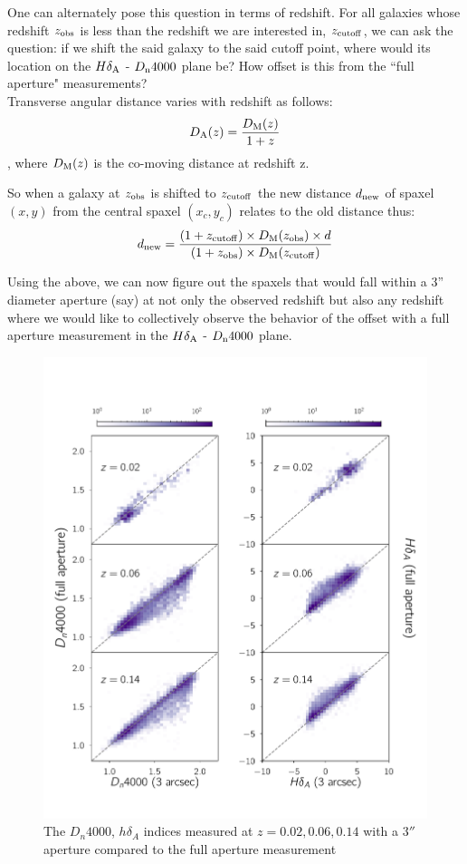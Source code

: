 One can alternately pose this question in terms of redshift. For all galaxies whose redshift $z_{\rm obs}$ is less than the redshift we are interested in, $z_{\rm cutoff}$, we can ask the question: if we shift the said galaxy to the said cutoff point, where would its location on the $H\delta_{\rm A}$ - $D_{\rm n}4000$ plane be? How offset is this from the ``full aperture" measurements?\\

Transverse angular distance varies with redshift as follows:
$$D_{\rm A}(z) = \frac{D_{\rm M}(z)}{1+z} $$,
where $D_{\rm M}(z)$ is the co-moving distance at redshift z.

So when a galaxy at $z_{\rm obs}$ is shifted to $z_{\rm cutoff}$ the new distance $d_{\rm new}$ of spaxel $(x,y)$ from the central spaxel $(x_{c},y_{c})$ relates to the old distance thus:
$$ d_{\rm new} = \frac{(1+z_{\rm cutoff})\times D_{\rm M}(z_{\rm obs}) \times d}{(1+z_{\rm obs}) \times  D_{\rm M}(z_{\rm cutoff})} $$

Using the above, we can now figure out the spaxels that would fall within a 3'' diameter aperture (say) at not only the observed redshift but also any redshift where we would like to collectively observe the behavior of the offset with a full aperture measurement in the $H\delta_{\rm A}$ - $D_{\rm n}4000$ plane.

\begin{figure}
\includegraphics[width=\textwidth]{figures/full_aperture_comparisons.pdf}
\caption[The $D_{n}4000$, $h\delta_{A}$ indices measured at $z = 0.02,0.06,0.14$ with a $3''$ aperture compared to the full aperture measurement]
{ The $D_{n}4000$, $h\delta_{A}$ indices measured at $z = 0.02,0.06,0.14$ with a $3''$ aperture compared to the full aperture measurement
\label{fig:redshift_comparison}}
\end{figure}


